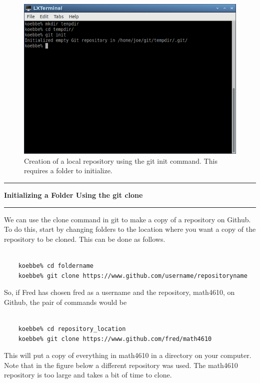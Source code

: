 \documentclass[10pt,fleqn]{article}
\begin{document}
\begin{figure}[h]
\centering
\includegraphics[width=5.0in]{../images/git_04.png}
\vskip0.1in
\caption{Creation of a local repository using the git init command. This
requires a folder to initialize.}
\end{figure}
\eject
\vskip0.1in\hrule\vskip0.1in\noindent
{\bf Initializing a Folder Using the git clone} 
\vskip0.1in\hrule\vskip0.1in\noindent
We can use the clone command in git to make a copy of a repository on Github.
To do this, start by changing folders to the location where you want a copy of
the repository to be cloned. This can be done as follows.
\begin{verbatim}

    koebbe% cd foldername
    koebbe% git clone https://www.github.com/username/repositoryname

\end{verbatim}
So, if Fred has chosen fred as a username and the repository, math4610, on
Github, the pair of commands would be
\begin{verbatim}

    koebbe% cd repository_location
    koebbe% git clone https://www.github.com/fred/math4610

\end{verbatim}
This will put a copy of everything in math4610 in a directory on your computer.
Note that in the figure below a different repository was used. The math4610
repository is too large and takes a bit of time to clone.
\vfill
\end{document}
